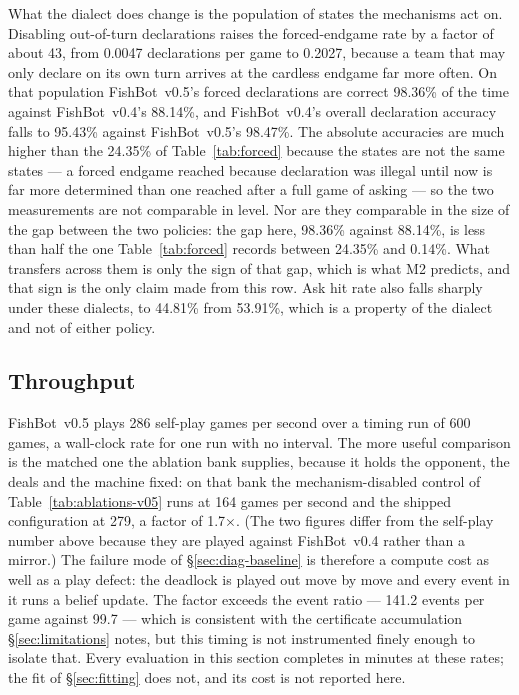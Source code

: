 \documentclass[11pt]{article}
\theoremstyle{definition}
\DeclareRobustCommand{\vfive}{\texorpdfstring{\mbox{FishBot v0.5}}{FishBot v0.5}}
\DeclareRobustCommand{\vfour}{\texorpdfstring{\mbox{FishBot v0.4}}{FishBot v0.4}}
\providecommand{\numVfiveForcedAcc}{24.35}
\providecommand{\numVfourForcedAcc}{0.14}
\providecommand{\numAblControlEvents}{141.2}
\providecommand{\numAblFullEvents}{99.7}
\providecommand{\numThroughputFixed}{279}
\providecommand{\numThroughputPatho}{164}
\providecommand{\numThroughputRatioFive}{1.7}
\providecommand{\numDialectDefaultForcedRate}{0.0047}
\providecommand{\numDialectDefaultHit}{53.91}
\providecommand{\numDialectNoOOTDeclFive}{98.47}
\providecommand{\numDialectNoOOTDeclFour}{95.43}
\providecommand{\numDialectNoOOTForcedFive}{98.36}
\providecommand{\numDialectNoOOTForcedFour}{88.14}
\providecommand{\numDialectNoOOTForcedRate}{0.2027}
\providecommand{\numDialectNoOOTHit}{44.81}
\providecommand{\numDialectForcedRatio}{43}
\providecommand{\numThroughputFive}{286}
\providecommand{\numThroughputGamesFive}{600}
\begin{document}
What the dialect does change is the population of states the mechanisms act on. Disabling out-of-turn declarations raises the
forced-endgame rate by a factor of about \numDialectForcedRatio{}, from
\numDialectDefaultForcedRate{} declarations per game to
\numDialectNoOOTForcedRate{}, because a team that may only declare on its own
turn arrives at the cardless endgame far more often. On that population
\vfive{}'s forced declarations are correct \numDialectNoOOTForcedFive\% of the
time against \vfour{}'s \numDialectNoOOTForcedFour\%, and \vfour{}'s overall
declaration accuracy falls to \numDialectNoOOTDeclFour\% against \vfive{}'s
\numDialectNoOOTDeclFive\%. The absolute accuracies are much higher than the
\numVfiveForcedAcc\% of Table~\ref{tab:forced} because the states are not the
same states --- a forced endgame reached because declaration was illegal until
now is far more determined than one reached after a full game of asking --- so
the two measurements are not comparable in level. Nor are they comparable in the
size of the gap between the two policies: the gap here, \numDialectNoOOTForcedFive\%
against \numDialectNoOOTForcedFour\%, is less than half the one
Table~\ref{tab:forced} records between \numVfiveForcedAcc\% and
\numVfourForcedAcc\%. What transfers across them is only the sign of that gap,
which is what M2 predicts, and that sign is the only claim made from this row. Ask hit rate also falls sharply under
these dialects, to \numDialectNoOOTHit\% from \numDialectDefaultHit\%, which is a
property of the dialect and not of either policy.

\subsection{Throughput}
\label{sec:results-throughput}

\vfive{} plays \numThroughputFive{} self-play games per second over a timing run
of \numThroughputGamesFive{} games, a wall-clock rate for one run with no
interval. The more useful comparison is the matched one the ablation bank
supplies, because it holds the opponent, the deals and the machine fixed: on that
bank the mechanism-disabled control of Table~\ref{tab:ablations-v05} runs at
\numThroughputPatho{} games per second and the shipped configuration at
\numThroughputFixed{}, a factor of \numThroughputRatioFive$\times$. (The two
figures differ from the self-play number above because they are played against
\vfour{} rather than a mirror.) The failure mode of \S\ref{sec:diag-baseline} is
therefore a compute cost as well as a play defect: the deadlock is played out move
by move and every event in it runs a belief update. The factor exceeds the event
ratio --- \numAblControlEvents{} events per game against \numAblFullEvents{} ---
which is consistent with the certificate accumulation \S\ref{sec:limitations}
notes, but this timing is not instrumented finely enough to isolate that. Every
evaluation in this section completes in minutes at these rates; the fit of
\S\ref{sec:fitting} does not, and its cost is not reported here.
\end{document}
